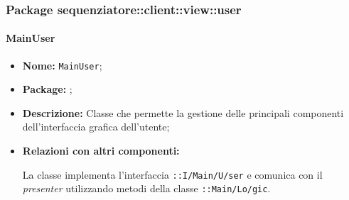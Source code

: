 \subsubsection{Package sequenziatore::client::view::user}

\paragraph{MainUser}
\begin{flushleft}
\begin{itemize}
\item \textbf{Nome:} \texttt{MainUser};
\item \textbf{Package:} \texttt{\viewAdmin{}};
\item \textbf{Descrizione:} Classe che permette la gestione delle principali componenti dell'interfaccia grafica dell'utente;
\item \textbf{Relazioni con altri componenti:}
\begin{sloppypar}
La classe implementa l'interfaccia \texttt{\iViewUser{}::I\fshyp{}Main\fshyp{}U\fshyp{}ser} e comunica con il \textit{presenter} utilizzando metodi della classe \texttt{\logicUser{}::Main\fshyp{}Lo\fshyp{}gic}.
\end{sloppypar}
\end{itemize}
\end{flushleft}

